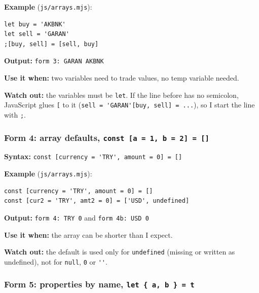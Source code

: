 \documentclass[
  11pt,
]{article}
\newcommand{\passthrough}[1]{#1}
\begin{document}
\textbf{Example} (\passthrough{\lstinline!js/arrays.mjs!}):

\begin{lstlisting}
let buy = 'AKBNK'
let sell = 'GARAN'
;[buy, sell] = [sell, buy]
\end{lstlisting}

\textbf{Output:} \passthrough{\lstinline!form 3: GARAN AKBNK!}

\textbf{Use it when:} two variables need to trade values, no temp
variable needed.

\textbf{Watch out:} the variables must be \passthrough{\lstinline!let!}.
If the line before has no semicolon, JavaScript glues
\passthrough{\lstinline![!} to it
(\passthrough{\lstinline!sell = 'GARAN'[buy, sell] = ...!}), so I start
the line with \passthrough{\lstinline!;!}.

\subsubsection{\texorpdfstring{Form 4: array defaults,
\texttt{const\ {[}a\ =\ 1,\ b\ =\ 2{]}\ =\ {[}{]}}}{Form 4: array defaults, const {[}a = 1, b = 2{]} = {[}{]}}}\label{form-4-array-defaults-const-a-1-b-2}

\textbf{Syntax:}
\passthrough{\lstinline!const [currency = 'TRY', amount = 0] = []!}

\textbf{Example} (\passthrough{\lstinline!js/arrays.mjs!}):

\begin{lstlisting}
const [currency = 'TRY', amount = 0] = []
const [cur2 = 'TRY', amt2 = 0] = ['USD', undefined]
\end{lstlisting}

\textbf{Output:} \passthrough{\lstinline!form 4: TRY 0!} and
\passthrough{\lstinline!form 4b: USD 0!}

\textbf{Use it when:} the array can be shorter than I expect.

\textbf{Watch out:} the default is used only for
\passthrough{\lstinline!undefined!} (missing or written as undefined),
not for \passthrough{\lstinline!null!}, \passthrough{\lstinline!0!} or
\passthrough{\lstinline!''!}.

\subsubsection{\texorpdfstring{Form 5: properties by name,
\texttt{let\ \{\ a,\ b\ \}\ =\ t}}{Form 5: properties by name, let \{ a, b \} = t}}\label{form-5-properties-by-name-let-a-b-t}
\end{document}
